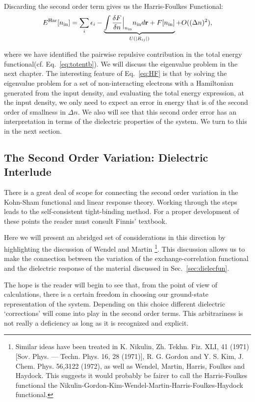 Discarding the second order term gives us the Harris-Foulkes Functional: 
%
\begin{equation}
\label{eq:HF}
	E^{\rm Har}[n_{\rm in}] = \sum_{i}\epsilon_{i} - \underbrace{\int \frac{\delta F}{\delta n} \Bigr|_{n_{\rm in}}n_{\rm in} d{\bf r} + F[n_{\rm in }]}_{U(|R_{ij}|)} + O((\Delta n)^{2}), 
\end{equation}
%

where we have identified the pairwise repulsive contribution in the total energy functional(cf. Eq.~\ref{eq:totentb}).
We will discuss the eigenvalue problem in the next chapter.
The interesting feature of Eq.~\ref{eq:HF} is that by solving the eigenvalue problem
for a set of non-interacting electrons with a Hamiltonian generated from the 
input density, and evaluating the total energy expression,
at the input density, we only need to expect an error in energy that 
is of the second order of smallness in $\Delta n$. We also will see that 
this second order error has an interpretation in terms of the dielectric
properties of the system. We turn to this in the next section.

\subsection{The Second Order Variation: Dielectric Interlude}
There is a great deal of scope for connecting the second order variation in the Kohn-Sham functional
and linear response theory. Working through the steps leads to the self-consistent tight-binding method.
For a proper development of these points the reader must consult 
Finnis' textbook\cite{finnis}. 

Here we will present an abridged set of considerations in this direction by 
highlighting the discussion of Wendel and Martin\cite{wendel78}
\footnote{Similar ideas have been treated in 
K. Nikulin, Zh. Tekhn. Fiz. XLI, 41 (1971) [Sov. Phys. — Techn. Phys. 16, 28 (1971)], 
R. G. Gordon and Y. S. Kim, J. Chem. Phys. 56,3122 (1972),
as well as Wendel, Martin, Harris, Foulkes and Haydock. This suggests it would
probably be fairer to call the Harris-Foulkes functional the 
Nikulin-Gordon-Kim-Wendel-Martin-Harris-Foulkes-Haydock functional.}.
This discussion allows us to make the connection between the variation of the exchange-correlation functional and 
the dielectric response of the material discussed in Sec.~\ref{sec:dielecfun}. 

The hope is the reader will begin to see that, from the point of view of calculations, there is 
a certain freedom in choosing our ground-state representation of the system. Depending on this choice
different dielectric `corrections' will come into play in the second order terms. 
This arbitrariness is not really a deficiency as long as it is recognized and explicit. 

